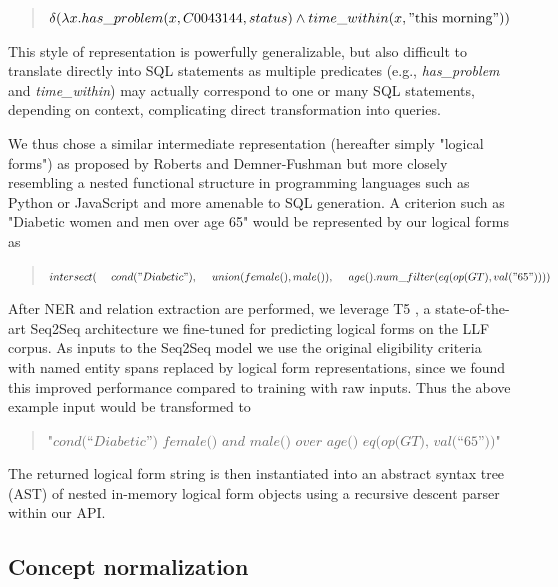 \documentclass[../main.tex]{subfiles}
\begin{document}
\begin{quote}
    \centering
    $\delta( \lambda x.has\_problem(x, C0043144, status) \wedge time\_within(x, \mathrm{"this\ morning"}))$
\end{quote}

\noindent This style of representation is powerfully generalizable, but also difficult to translate directly into SQL statements as multiple predicates (e.g., \textit{has\_problem} and \textit{time\_within}) may actually correspond to one or many SQL statements, depending on context, complicating direct transformation into queries.

We thus chose a similar intermediate representation (hereafter simply "logical forms") as proposed by Roberts and Demner-Fushman but more closely resembling a nested functional structure in programming languages such as Python or JavaScript and more amenable to SQL generation. A criterion such as "Diabetic women and men over age 65" would be represented by our logical forms as

\begin{quote}
$intersect( \\
    \mathrm{\ \ \ \ }cond("Diabetic"), \\
    \mathrm{\ \ \ \ }union(female(), male()),\\
    \mathrm{\ \ \ \ }age().num\_filter(eq(op(GT), val("65"))) \\
)$
\end{quote}

After NER and relation extraction are performed, we leverage T5 \cite{raffel2020exploring}, a state-of-the-art Seq2Seq architecture we fine-tuned for predicting logical forms on the LLF corpus. As inputs to the Seq2Seq model we use the original eligibility criteria with named entity spans replaced by logical form representations, since we found this improved performance compared to training with raw inputs. Thus the above example input would be transformed to

\begin{quote}
    \centering
    $\textit{"cond(“Diabetic”) female() and male() over age() eq(op(GT), val(“65”))"}$
\end{quote}

\noindent The returned logical form string is then instantiated into an abstract syntax tree (AST) of nested in-memory logical form objects using a recursive descent parser \cite{johnstone1998generalised} within our API.

\subsection{Concept normalization}
\end{document}
